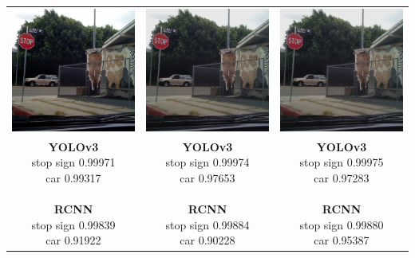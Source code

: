 \documentclass{article}
\begin{document}
\begin{center}
    \begin{tabular}{c c c}
        \includegraphics[width=0.3\linewidth]{../test_images/stop3.png} & \includegraphics[width=0.3\linewidth]{../test_images/dispersion_reduced/stop3_25.png} & \includegraphics[width=0.3\linewidth]{../test_images/dispersion_reduced/stop3_50.png} \\

        \makecell[t]{\textbf{YOLOv3} \\ stop sign 0.99971 \\ car 0.99317 \\ \\ \textbf{RCNN} \\ stop sign 0.99839 \\ car 0.91922 \\} & \makecell[t]{\textbf{YOLOv3} \\ stop sign 0.99974 \\ car 0.97653 \\ \\ \textbf{RCNN} \\ stop sign 0.99884 \\ car 0.90228} & \makecell[t]{\textbf{YOLOv3} \\ stop sign 0.99975 \\ car 0.97283 \\ \\ \textbf{RCNN} \\ stop sign 0.99880 \\ car 0.95387}
\end{tabular}
\end{center}
\end{document}

